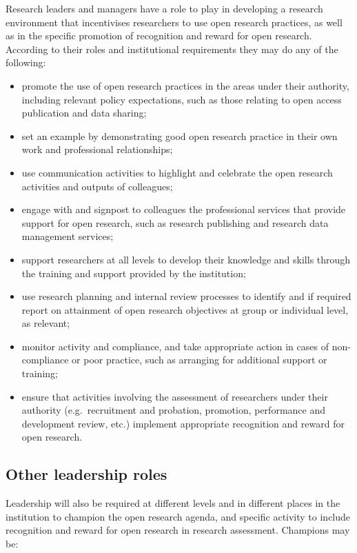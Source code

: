 \documentclass[
  letterpaper,
  DIV=11,
  numbers=noendperiod,
  oneside]{scrreprt}
\begin{document}
Research leaders and managers have a role to play in developing a
research environment that incentivises researchers to use open research
practices, as well as in the specific promotion of recognition and
reward for open research. According to their roles and institutional
requirements they may do any of the following:

\begin{itemize}
\item
  promote the use of open research practices in the areas under their
  authority, including relevant policy expectations, such as those
  relating to open access publication and data sharing;
\item
  set an example by demonstrating good open research practice in their
  own work and professional relationships;
\item
  use communication activities to highlight and celebrate the open
  research activities and outputs of colleagues;
\item
  engage with and signpost to colleagues the professional services that
  provide support for open research, such as research publishing and
  research data management services;
\item
  support researchers at all levels to develop their knowledge and
  skills through the training and support provided by the institution;
\item
  use research planning and internal review processes to identify and if
  required report on attainment of open research objectives at group or
  individual level, as relevant;
\item
  monitor activity and compliance, and take appropriate action in cases
  of non-compliance or poor practice, such as arranging for additional
  support or training;
\item
  ensure that activities involving the assessment of researchers under
  their authority (e.g.~recruitment and probation, promotion,
  performance and development review, etc.) implement appropriate
  recognition and reward for open research.
\end{itemize}

\subsection{Other leadership roles}\label{other-leadership-roles}

Leadership will also be required at different levels and in different
places in the institution to champion the open research agenda, and
specific activity to include recognition and reward for open research in
research assessment. Champions may be:
\end{document}
